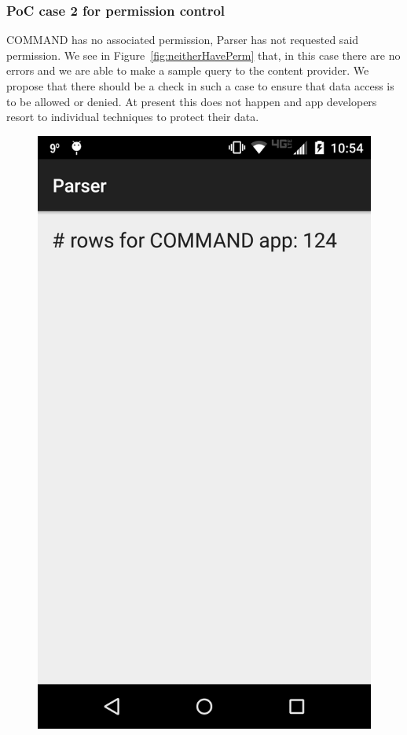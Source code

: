 \subsubsection{PoC case 2 for permission control} COMMAND has no associated permission, Parser has not requested said permission. We see in Figure~\ref{fig:neitherHavePerm} that, in this case there are no errors and we are able to make a sample query to the content provider. We propose that there should be a check in such a case to ensure that data access is to be allowed or denied. At present this does not happen and app developers resort to individual techniques to protect their data.
\begin{figure}
\centering
\begin{minipage}{.45\columnwidth}
	\includegraphics[width=\columnwidth,scale=0.5]{images/bothHavePerm}

\end{minipage}
\end{figure}
